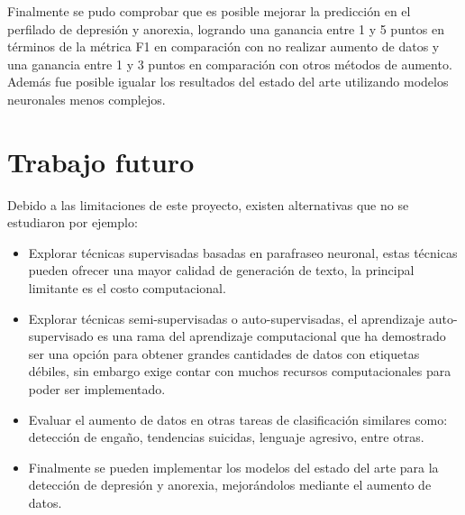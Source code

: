 Finalmente se pudo comprobar que es posible mejorar la predicción en el perfilado de depresión y anorexia, logrando una ganancia entre 1 y 5 puntos en términos de la métrica F1 en comparación con no realizar aumento de datos y una ganancia entre 1 y 3 puntos en comparación con otros métodos de aumento. Además fue posible igualar los resultados del estado del arte utilizando modelos neuronales menos complejos.


\section{Trabajo futuro}

Debido a las limitaciones de este proyecto, existen alternativas que no se estudiaron por ejemplo:

\begin{itemize}
    \item Explorar técnicas supervisadas basadas en parafraseo neuronal, estas técnicas pueden ofrecer una mayor calidad de generación de texto, la principal limitante es el costo computacional.
    
    \item Explorar técnicas semi-supervisadas o auto-supervisadas, el aprendizaje auto-supervisado es una rama del aprendizaje computacional que ha demostrado ser una opción para obtener grandes cantidades de datos con etiquetas débiles, sin embargo exige contar con muchos recursos computacionales para poder ser implementado.
    
    \item Evaluar el aumento de datos en otras tareas de clasificación similares como: detección de engaño, tendencias suicidas, lenguaje agresivo, entre otras.
    
    \item Finalmente se pueden implementar los modelos del estado del arte para la detección de depresión y anorexia, mejorándolos mediante el aumento de datos.
    
    
\end{itemize}

